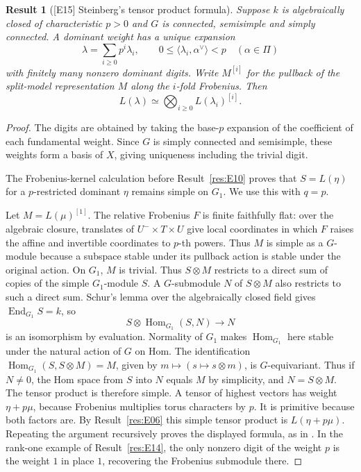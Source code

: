 \documentclass[11pt,a4paper,openany,oneside]{book}
\theoremstyle{resultstyle}
\newtheorem{statement}{Result}[chapter]
\newenvironment{result}[2]{\clubpenalty=10000\begin{statement}[\textnormal{[#1]} #2]\leavevmode\label{res:#1}\ignorespaces}{\end{statement}}
\theoremstyle{definition}
\numberwithin{equation}{chapter}
\begin{document}
\begin{result}{E15}{Steinberg's tensor product formula}
Suppose \(k\) is algebraically closed of characteristic \(p>0\) and \(G\) is connected, semisimple and simply connected. A dominant weight has a unique expansion
\[
 \lambda=\sum_{i\geq0}p^i\lambda_i,\qquad
 0\leq\langle\lambda_i,\alpha^\vee\rangle<p
 \quad(\alpha\in\Pi)
\]
with finitely many nonzero dominant digits. Write \(M^{[i]}\) for the pullback of the split-model representation \(M\) along the \(i\)-fold Frobenius. Then
\[
 L(\lambda)\simeq\bigotimes_{i\geq0} L(\lambda_i)^{[i]} .
\]
\end{result}
\begin{proof}
The digits are obtained by taking the base-\(p\) expansion of the coefficient of each fundamental weight. Since \(G\) is simply connected and semisimple, these weights form a basis of \(X\), giving uniqueness including the trivial digit.

The Frobenius-kernel calculation before
Result~\ref{res:E10} proves that \(S=L(\eta)\) for a
\(p\)-restricted dominant \(\eta\) remains simple on \(G_1\).
We use this with \(q=p\).

Let \(M=L(\mu)^{[1]}\). The relative Frobenius \(F\) is finite faithfully flat: over the algebraic closure, translates of \(U^-\times T\times U\) give local coordinates in which \(F\) raises the affine and invertible coordinates to \(p\)-th powers. Thus \(M\) is simple as a \(G\)-module because a subspace stable under its pullback action is stable under the original action. On \(G_1\), \(M\) is trivial. Thus \(S\otimes M\) restricts to a direct sum of copies of the simple \(G_1\)-module \(S\). A \(G\)-submodule \(N\) of \(S\otimes M\) also restricts to such a direct sum. Schur's lemma over the algebraically closed field gives \(\operatorname{End}_{G_1}S=k\), so
\[
 S\otimes \operatorname{Hom}_{G_1}(S,N)\longrightarrow N
\]
is an isomorphism by evaluation. Normality of \(G_1\) makes \(\operatorname{Hom}_{G_1}\) here stable under the natural action of \(G\) on Hom. The identification
\(\operatorname{Hom}_{G_1}(S,S\otimes M)=M\), given by \(m\mapsto(s\mapsto s\otimes m)\), is \(G\)-equivariant. Thus if \(N\ne0\), the Hom space from \(S\) into \(N\) equals \(M\) by simplicity, and \(N=S\otimes M\). The tensor product is therefore simple. A tensor of highest vectors has weight \(\eta+p\mu\), because Frobenius multiplies torus characters by \(p\). It is primitive because both factors are. By Result~\ref{res:E06} this simple tensor product is \(L(\eta+p\mu)\). Repeating the argument recursively proves the displayed formula, as in \cite[Part~II, Sections~3.16--3.17]{jantzen}. In the rank-one example of Result~\ref{res:E14}, the only nonzero digit of the weight \(p\) is the weight \(1\) in place \(1\), recovering the Frobenius submodule there.
\end{proof}
\end{document}
